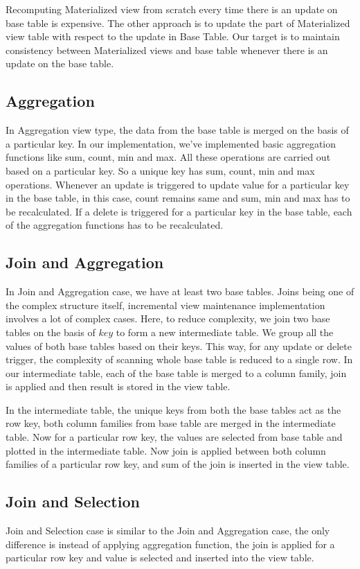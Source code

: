 \documentclass[11pt,a4paper,bibtotoc,idxtotoc,headsepline,footsepline,footexclude,BCOR12mm,DIV13]{scrbook}
\begin{document}
Recomputing Materialized view from scratch every time there is an update on base table is expensive. The other approach is to update the part of Materialized view table with respect to the update in Base Table. Our target is to maintain consistency between Materialized views and base table whenever there is an update on the base table.


\subsection{Aggregation}
In Aggregation view type, the data from the base table is merged on the basis of a particular key. In our implementation, we've implemented basic aggregation functions like sum, count, min and max. All these operations are carried out based on a particular key. So a unique key has sum, count, min and max operations. Whenever an update is triggered to update value for a particular key in the base table, in this case, count remains same and sum, min and max has to be recalculated. If a delete is triggered for a particular key in the base table, each of the aggregation functions has to be recalculated. 


\subsection{Join and Aggregation}
In Join and Aggregation case, we have at least two base tables. Joins being one of the complex structure itself, incremental view maintenance implementation involves a lot of complex cases. Here, to reduce complexity, we join two base tables on the basis of $key$ to form a new intermediate table. We group all the values of both base tables based on their keys. This way, for any update or delete trigger, the complexity of scanning whole base table is reduced to a single row. In our intermediate table, each of the base table is merged to a column family, join is applied and then result is stored in the view table. 

In the intermediate table, the unique keys from both the base tables act as the row key, both column families from base table are merged in the intermediate table. Now for a particular row key, the values are selected from base table and plotted in the intermediate table. Now join is applied between both column families of a particular row key, and sum of the join is inserted in the view table.  


\subsection{Join and Selection}
Join and Selection case is similar to the Join and Aggregation case, the only difference is instead of applying aggregation function, the join is applied for a particular row key and value is selected and inserted into the view table.
\end{document}
